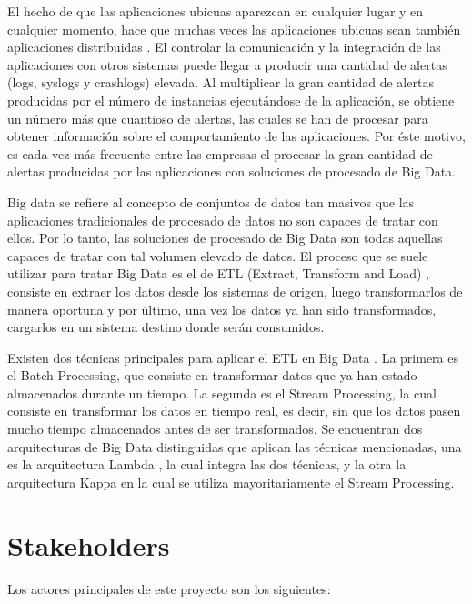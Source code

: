 El hecho de que las aplicaciones ubicuas aparezcan en cualquier lugar y en cualquier momento, hace que muchas veces las aplicaciones ubicuas sean también aplicaciones distribuidas \cite{Tfg:distributedapp}. El controlar la comunicación y la integración de las aplicaciones con otros sistemas puede llegar a producir una cantidad de alertas (logs, syslogs y crashlogs) elevada. Al multiplicar la gran cantidad de alertas producidas por el número de instancias ejecutándose de la aplicación, se obtiene un número más que cuantioso de alertas, las cuales se han de procesar para obtener información sobre el comportamiento de las aplicaciones. Por éste motivo, es cada vez más frecuente entre las empresas el procesar la gran cantidad de alertas producidas por las aplicaciones con soluciones de procesado de Big Data.

Big data \cite{Tfg:bigdata} se refiere al concepto de conjuntos de datos tan masivos que las aplicaciones tradicionales de procesado de datos no son capaces de tratar con ellos. Por lo tanto, las soluciones de procesado de Big Data son todas aquellas capaces de tratar con tal volumen elevado de datos. El proceso que se suele utilizar para tratar Big Data es el de ETL (Extract, Transform and Load) \cite{Tfg:etl}, consiste en extraer los datos desde los sistemas de origen, luego transformarlos de manera oportuna y por último, una vez los datos ya han sido transformados, cargarlos en un sistema destino donde serán consumidos. 

Existen dos técnicas principales para aplicar el ETL en Big Data \cite{Tfg:batchstream}. La primera es el Batch Processing, que consiste en transformar datos que ya han estado almacenados durante un tiempo. La segunda es el Stream Processing, la cual consiste en transformar los datos en tiempo real, es decir, sin que los datos pasen mucho tiempo almacenados antes de ser transformados. Se encuentran dos arquitecturas de Big Data distinguidas que aplican las técnicas mencionadas, una es la arquitectura Lambda \cite{Tfg:lambda}, la cual integra las dos técnicas, y la otra la arquitectura Kappa \cite{Tfg:kappa} en la cual se utiliza mayoritariamente el Stream Processing.


\section{Stakeholders}
Los actores principales de este proyecto son los siguientes:

